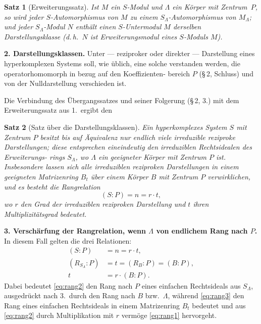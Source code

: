 \documentclass[12pt,a4paper]{article}
\theoremstyle{plain}
\newtheorem*{satz}{Satz}
\begin{document}
\begin{satz}[Erweiterungssatz]
Ist $M$ ein $S$-Modul und $\Lambda$ ein K\"orper mit Zentrum~$P$,
so wird jeder $S$-Automorphismus von $M$ zu einem $S_\Lambda$-Automorphismus
von $M_\Lambda$; und jeder $S_\Lambda$-Modul $N$ enth\"alt einen $S$-Untermodul $M$
derselben Darstellungsklasse (d.\,h.\ $N$ ist Erweiterungsmodul eines $S$-Moduls
$M$).
\end{satz}

\medskip
\noindent\textbf{2. Darstellungsklassen.}\hspace{0.5em}%
Unter --- reziproker oder direkter ---
Darstellung eines hyperkomplexen Systems soll, wie \"ublich, eine solche
verstanden werden, die operatorhomomorph in bezug auf den Koeffizienten-
bereich $P$ (\S\,2, Schluss) und von der Nulldarstellung verschieden ist.

Die Verbindung des \"Ubergangssatzes und seiner Folgerung (\S\,2, 3.) mit dem
Erweiterungssatz aus 1.\ ergibt den

\begin{satz}[Satz \"uber die Darstellungsklassen]
Ein hyperkomplexes System $S$ mit Zentrum $P$ besitzt bis
auf \"Aquivalenz nur endlich viele irreduzible reziproke Darstellungen; diese
entsprechen eineindeutig den irreduziblen Rechtsidealen des Erweiterungs-
rings $S_\Lambda$, wo $\Lambda$ ein geeigneter K\"orper mit Zentrum $P$ ist. Insbesondere
lassen sich alle irreduziblen reziproken Darstellungen in einem geeigneten
Matrizenring $B_t$ \"uber einem K\"orper $B$ mit Zentrum $P$ verwirklichen,
und es besteht die Rangrelation
\[
(S : P) = n = r \cdot t,
\]
wo $r$ den Grad der irreduziblen reziproken Darstellung und $t$ ihren
Multiplizit\"atsgrad bedeutet.
\end{satz}


\medskip
\noindent\textbf{3. Versch\"arfung der Rangrelation, wenn $\Lambda$ von endlichem
Rang nach $P$.}\hspace{0.5em}%
In diesem Fall gelten die drei Relationen:
\begin{align}
(S : P) &= n = r \cdot t, \label{eq:rang1} \\
(R_{S_\Lambda} : P) &= t = (R_B : P) = (B : P), \label{eq:rang2} \\
t &= r \cdot (B : P). \label{eq:rang3}
\end{align}
Dabei bedeutet \eqref{eq:rang2} den Rang nach $P$ eines einfachen Rechtsideals aus $S_\Lambda$,
ausgedr\"uckt nach 3.\ durch den Rang nach $B$ bzw.\ $\Lambda$, w\"ahrend \eqref{eq:rang3} den
Rang eines einfachen Rechtsideals in einem Matrizenring $B_t$ bedeutet und
aus \eqref{eq:rang2} durch Multiplikation mit $r$ verm\"oge \eqref{eq:rang1} hervorgeht.
\end{document}
